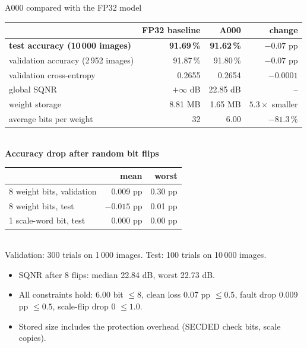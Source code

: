 \documentclass[aspectratio=169,10pt]{beamer}
\newcommand{\hlrow}{\rowcolor{hl}}
\begin{document}
\begin{frame}{A000 compared with the FP32 model}
  \small
  \begin{tabular}{@{}lrrr@{}}
    \toprule
    & FP32 baseline & A000 & change\\
    \midrule
    \hlrow \textbf{test accuracy (10\,000 images)} & \textbf{91.69\,\%} & \textbf{91.62\,\%} & $-0.07$ pp\\
    validation accuracy (2\,952 images) & 91.87\,\% & 91.80\,\% & $-0.07$ pp\\
    validation cross-entropy & 0.2655 & 0.2654 & $-0.0001$\\
    global SQNR & $+\infty$ dB & 22.85 dB & --\\
    weight storage & 8.81 MB & 1.65 MB & $5.3\times$ smaller\\
    average bits per weight & 32 & 6.00 & $-81.3\,\%$\\
    \bottomrule
  \end{tabular}\\[3mm]
  \textbf{Accuracy drop after random bit flips}\\[1mm]
  \begin{tabular}{@{}lrr@{}}
    \toprule
    & mean & worst\\
    \midrule
    8 weight bits, validation & 0.009 pp & 0.30 pp\\
    8 weight bits, test & $-0.015$ pp & 0.01 pp\\
    1 scale-word bit, test & 0.000 pp & 0.00 pp\\
    \bottomrule
  \end{tabular}\\[1mm]
  {\scriptsize Validation: 300 trials on 1\,000 images. Test: 100 trials on 10\,000 images.}
  \begin{itemize}\footnotesize
    \item SQNR after 8 flips: median 22.84 dB, worst 22.73 dB.
    \item All constraints hold: 6.00 bit $\le 8$, clean loss 0.07 pp $\le 0.5$, fault drop 0.009 pp $\le 0.5$, scale-flip drop 0 $\le 1.0$.
    \item Stored size includes the protection overhead (SECDED check bits, scale copies).
  \end{itemize}
\end{frame}
\end{document}
